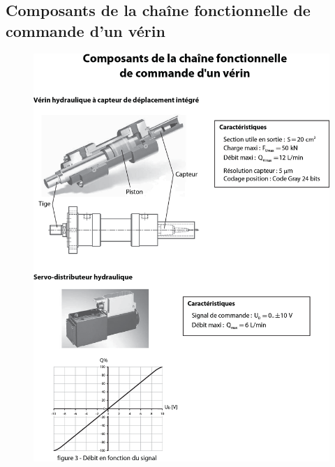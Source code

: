 \documentclass[10pt,fleqn]{article} %
\begin{document}
\subsection{\label{ann_02}Composants de la chaîne fonctionnelle de commande d'un vérin}
\begin{figure}[H]
\centering
\includegraphics[width=\linewidth]{ann_b}
\end{figure}
\end{document}
